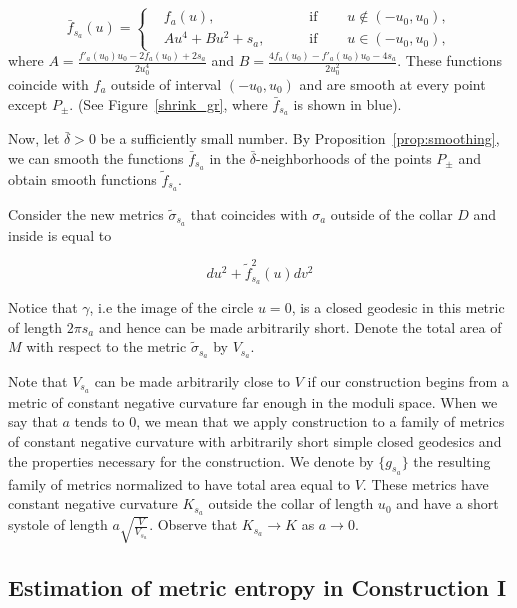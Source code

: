 \documentclass[12pt]{article}
\numberwithin{equation}{section}
\theoremstyle{definition}
\begin{document}
\begin{equation*}
\bar f_{s_a}(u) = \left\{
  \begin{aligned} & f_a(u), \qquad &\text{ if }\quad &u\not\in(-u_0,u_0),\\
& Au^4+Bu^2+s_a, \qquad &\text{ if }\quad &u\in(-u_0,u_0),
\end{aligned} \right.
\end{equation*}
where $A = \frac{f'_a(u_0)u_0-2f_a(u_0)+2s_a}{2u_0^4}$ and $B = \frac{4f_a(u_0)-f'_a(u_0)u_0-4s_a}{2u_0^2}$. These functions coincide with $f_a$ outside of interval $(-u_0,u_0)$ and are smooth at every point except $P_{\pm}$. (See Figure~\ref{shrink_gr}, where $\bar f_{s_a}$ is shown in blue).

Now, let $\bar\delta>0$ be a sufficiently small number. By Proposition~\ref{prop:smoothing}, we can smooth the functions $\bar f_{s_a}$ in the $\bar\delta$-neighborhoods of the points $P_{\pm}$ and obtain   smooth functions $\tilde f_{s_a}$.


Consider the new metrics $\tilde\sigma_{s_a}$  that coincides with $\sigma_a$ outside of the collar $D$ and inside is  equal to 

\begin{equation}\label{rotation-metric}
du^2+ \tilde f_{s_a}^2(u)dv^2
\end{equation}

Notice that $\gamma$, i.e the image of the circle $u=0$, is a closed geodesic in this metric of length $2\pi s_a$ and hence can be made arbitrarily short. 
Denote the total area  of $M$ with respect to the metric $\tilde\sigma_{s_a}$ by  $V_{s_a}$. 


Note that $V_{s_a}$ can be made arbitrarily close to $V$ if our construction begins from a metric of constant negative curvature far enough in the moduli space. When we say that $a$ tends to $0$, we mean that we apply construction to a family of metrics of constant negative curvature with arbitrarily short simple closed geodesics and the properties necessary for the construction. We denote by $\{g_{s_a}\}$ the resulting family of metrics normalized to have total area equal to $V$. These metrics have constant negative curvature $K_{s_a}$ outside the collar of length $u_0$ and have a short systole of length $a\sqrt{\frac{V}{V_{s_a}}}$. Observe that $K_{s_a}\to K$ as $a\to 0$.

\subsection{Estimation of metric entropy in Construction I}\label{metr_1}
\end{document}
